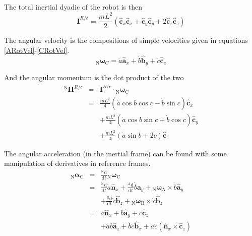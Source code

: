 \documentclass[lettersize,journal]{IEEEtran}
\begin{document}
The total inertial dyadic of the robot is then
\begin{equation}
  \mathbf{I}^{R/c} = \frac{mL^2}{2} \left(\mathbf{\hat{c}}_x\mathbf{\hat{c}}_x + \mathbf{\hat{c}}_y\mathbf{\hat{c}}_y + 2 \mathbf{\hat{c}}_z\mathbf{\hat{c}}_z\right)
\end{equation}

The angular velocity is the compositions of simple velocities given in equations \ref{ARotVel}-\ref{CRotVel}.
\begin{equation}
  {_\mathrm{N}\boldsymbol\omega_C} = \dot{a}\mathbf{\hat{a}}_x + \dot{b} \mathbf{\hat{b}}_y + \dot{c} \mathbf{\hat{c}}_z
\end{equation}

And the angular momentum is the dot product of the two
\begin{eqnarray}
  {^\mathrm{N}\mathbf{H}^{R/c}} &=& \mathbf{I}^{R/c} \cdot {_\mathrm{N}\boldsymbol\omega_\mathrm{C}}\nonumber\\
  &=&\frac{mL^2}{4}\left(\dot{a} \cos b \cos c - \dot{b} \sin c\right) \mathbf{\hat{c}}_x\nonumber\\
  &&+\frac{mL^2}{4}\left(\dot{a} \cos b \sin c + \dot{b} \cos c\right) \mathbf{\hat{c}}_y\nonumber\\
  &&+\frac{mL^2}{4}\left(\dot{a}\sin b + 2\dot{c}\right) \mathbf{\hat{c}}_z
\end{eqnarray}


The angular acceleration (in the inertial frame) can be found with some manipulation of derivatives in reference frames.
\begin{eqnarray}
  {_\mathrm{N}\boldsymbol\alpha_\mathrm{C}} &=& \frac{^\mathrm{N}\mathrm{d}}{\mathrm{d}t} {_\mathrm{N}\boldsymbol\omega_\mathrm{C}} \nonumber\\
  &=& \frac{^\mathrm{N}\mathrm{d}}{\mathrm{d}t} \dot{a} \mathbf{\hat{n}}_x + \frac{^\mathrm{A}\mathrm{d}}{\mathrm{d}t} \dot{b} \mathbf{a}_y + {_\mathrm{N}\boldsymbol\omega_\mathrm{A}} \times \dot{b} \mathbf{\hat{a}}_y\nonumber\\
  && + \frac{^\mathrm{B}\mathrm{d}}{\mathrm{d} t} \dot{c} \mathbf{\hat{b}}_z + {_\mathrm{N}\boldsymbol\omega_\mathrm{B}} \times \dot{c} \mathbf{\hat{b}}_z \nonumber\\
  &=& \ddot{a}\mathbf{\hat{n}}_x + \ddot{b} \mathbf{\hat{a}}_y + \ddot{c} \mathbf{\hat{c}}_z\nonumber\\
  &&+\dot{a}\dot{b}\mathbf{\hat{a}}_z + \dot{b}\dot{c} \mathbf{\hat{b}}_x + \dot{a}\dot{c} \left(\mathbf{\hat{n}}_x \times \mathbf{\hat{c}}_z\right) 
\end{eqnarray}
\end{document}

